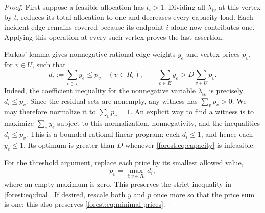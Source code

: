 \documentclass[letterpaper,11pt]{article}
\theoremstyle{definition}
\begin{document}
\begin{proof}
First suppose a feasible allocation has $t_i>1$.  Dividing all
$\lambda_{iv}$ at this vertex by $t_i$ reduces its total allocation to
one and decreases every capacity load.  Each incident edge remains
covered because its endpoint $i$ alone now contributes one.  Applying
this operation at every such vertex proves the last assertion.

Farkas' lemma gives nonnegative rational edge weights $y_e$ and vertex
prices $p_v$, for $v\in U$, such that
\begin{equation}
 d_i:=\sum_{e\ni i}y_e\leq p_v\quad(v\in R_i),
 \qquad
 \sum_{e\in E}y_e>D\sum_{v\in U}p_v.
 \label{forest:eq:dual}
\end{equation}
Indeed, the coefficient inequality for the nonnegative variable
$\lambda_{iv}$ is precisely $d_i\leq p_v$.  Since the residual sets
are nonempty, any witness has $\sum_vp_v>0$.  We may therefore normalize
it to $\sum_vp_v=1$.  An explicit way to find a witness is to maximize
$\sum_ey_e$ subject to this normalization, nonnegativity, and the
inequalities $d_i\leq p_v$.  This is a bounded rational linear program:
each $d_i\leq 1$, and hence each $y_e\leq 1$.  Its optimum is greater
than $D$ whenever \eqref{forest:eq:capacity} is infeasible.

For the threshold argument, replace each price by its smallest allowed
value,
\begin{equation}
 p_v=\max_{i:v\in R_i}d_i,
 \label{forest:eq:minimal-prices}
\end{equation}
where an empty maximum is zero.  This preserves the strict inequality
in \eqref{forest:eq:dual}.  If desired, rescale both $y$ and $p$ once
more so that the price sum is one; this also preserves
\eqref{forest:eq:minimal-prices}.


\end{proof}
\end{document}
